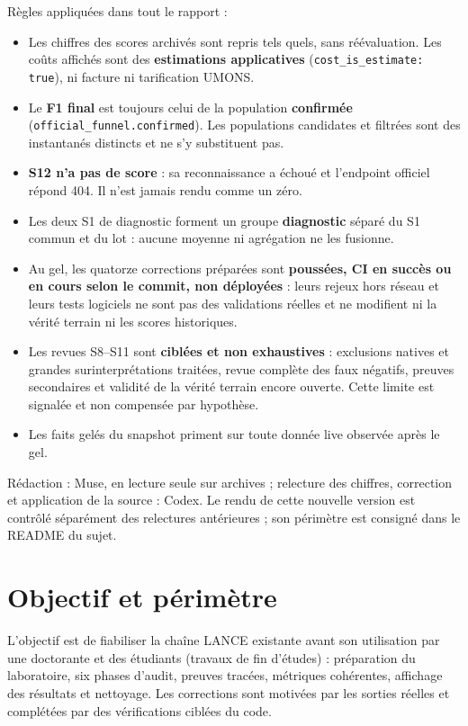 \documentclass[11pt,a4paper]{article}
\newcommand{\code}[1]{{\urlstyle{tt}\nolinkurl{#1}}}
\begin{document}
R\`egles appliqu\'ees dans tout le rapport :
\begin{itemize}
\item Les chiffres des scores archiv\'es sont repris tels quels, sans r\'e\'evaluation. Les co\^uts affich\'es sont des \textbf{estimations applicatives} (\code{cost_is_estimate: true}), ni facture ni tarification UMONS.
\item Le \textbf{F1 final} est toujours celui de la population \textbf{confirm\'ee} (\code{official_funnel.confirmed}). Les populations candidates et filtr\'ees sont des instantan\'es distincts et ne s'y substituent pas.
\item \textbf{S12 n'a pas de score} : sa reconnaissance a \'echou\'e et l'endpoint officiel r\'epond 404. Il n'est jamais rendu comme un z\'ero.
\item Les deux S1 de diagnostic forment un groupe \textbf{diagnostic} s\'epar\'e du S1 commun et du lot : aucune moyenne ni agr\'egation ne les fusionne.
\item Au gel, les quatorze corrections préparées sont \textbf{pouss\'ees, CI en succ\`es ou en cours selon le commit, non d\'eploy\'ees} : leurs rejeux hors r\'eseau et leurs tests logiciels ne sont pas des validations r\'eelles et ne modifient ni la v\'erit\'e terrain ni les scores historiques.
\item Les revues S8--S11 sont \textbf{cibl\'ees et non exhaustives} : exclusions natives et grandes surinterpr\'etations trait\'ees, revue compl\`ete des faux n\'egatifs, preuves secondaires et validit\'e de la v\'erit\'e terrain encore ouverte. Cette limite est signal\'ee et non compens\'ee par hypoth\`ese.
\item Les faits gel\'es du snapshot priment sur toute donn\'ee live observ\'ee apr\`es le gel.
\end{itemize}
Rédaction : Muse, en lecture seule sur archives ; relecture des chiffres, correction et application de la source : Codex. Le rendu de cette nouvelle version est contrôlé séparément des relectures antérieures ; son périmètre est consigné dans le README du sujet.

\section{Objectif et p\'erim\`etre}
\label{sec:objectif}
L'objectif est de fiabiliser la cha\^ine LANCE existante avant son utilisation par une doctorante et des \'etudiants (travaux de fin d'\'etudes) : pr\'eparation du laboratoire, six phases d'audit, preuves trac\'ees, m\'etriques coh\'erentes, affichage des r\'esultats et nettoyage. Les corrections sont motiv\'ees par les sorties r\'eelles et compl\'et\'ees par des v\'erifications cibl\'ees du code.
\end{document}
